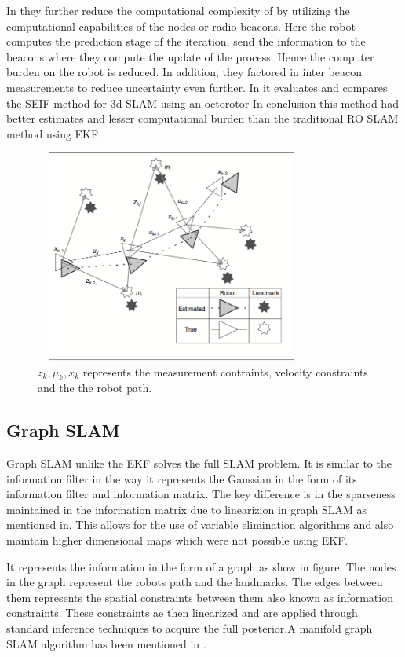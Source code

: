 \documentclass[conference]{IEEEtran}
\begin{document}
In \cite{Torres-Gonzalez2014} they further reduce the computational complexity of by utilizing the computational capabilities of the nodes or radio  beacons. Here the robot computes the prediction stage of the iteration, send the information to the beacons where they compute the update of the process. Hence the computer burden on the robot is reduced. In addition, they factored in inter beacon measurements to reduce uncertainty even further. In \cite{Torres-Gonzalez2017} it evaluates and compares  the SEIF method for 3d SLAM using an octorotor In conclusion this method had better estimates and lesser computational burden than the traditional RO SLAM method using EKF. 

\begin{figure}[h!]
	\centering
	\includegraphics[height=70mm,width=90mm]{graph_slam.PNG}
	\caption{$z_k,\mu_k,x_k$ represents the measurement contraints, velocity constraints and the the robot path.}
	
\end{figure}

	
	
	
\subsection{Graph SLAM}
Graph SLAM unlike the EKF solves the full SLAM problem. It is similar to the information filter in the way it represents the Gaussian  in the form of its information filter and information matrix. The key difference is in the sparseness maintained in the information matrix due to linearizion in graph SLAM as mentioned in\cite{Thrun2002a}. This allows for the use of variable elimination algorithms and also maintain higher dimensional maps which were not possible using EKF.

It represents the information in the form of a graph as show in figure. The nodes in the graph represent the robots path and the landmarks. The edges between them represents the spatial  constraints between them also known as information constraints. These constraints ae then linearized and are applied through standard inference techniques to acquire the full posterior.A manifold graph SLAM algorithm has been mentioned in \cite{Grisetti}.
	
\end{document}
